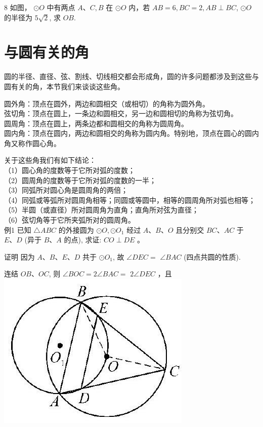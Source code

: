 \documentclass[10pt]{article}
\begin{document}
8 如图， $\odot O$ 中有两点 $A 、 C, B$ 在 $\odot O$ 内，若 $A B=6, B C=2, A B \perp B C$, $\odot O$ 的半径为 $5 \sqrt{2}$, 求 $O B$.

\section*{与圆有关的角}
圆的半径、直径、弦、割线、切线相交都会形成角，圆的许多问题都涉及到这些与圆有关的角，本节我们来谈谈这些角。

圆外角：顶点在圆外，两边和圆相交（或相切）的角称为圆外角。\\
弦切角：顶点在圆上，一条边和圆相交，另一边和圆相切的角称为弦切角。\\
圆周角：顶点在圆上，两条边都和圆相交的角称为圆周角。\\
圆内角：顶点在圆内，两边和圆相交的角称为圆内角。特别地，顶点在圆心的圆内角又称作圆心角。

关于这些角我们有如下结论：\\
（1）圆心角的度数等于它所对弧的度数；\\
（2）圆周角的度数等于它所对弧的度数的一半；\\
（3）同弧所对圆心角是圆周角的两倍；\\
（4）同弧或等弧所对圆周角相等；同圆或等圆中，相等的圆周角所对弧也相等；\\
（5）半圆（或直径）所对圆周角为直角；直角所对弦为直径；\\
（6）弦切角等于它所夹弧所对的圆周角。\\
例1 已知 $\triangle A B C$ 的外接圆为 $\odot O, \odot O_{1}$ 经过 $A 、 B 、 O$ 且分别交 $B C 、 A C$ 于 $E 、 D$ (异于 $B 、 A$ 的点), 求证: $C O \perp D E$ 。

证明 因为 $A 、 B 、 E 、 D$ 共于 $\odot O_{1}$, 故 $\angle D E C=$ $\angle B A C$ (四点共圆的性质).

连结 $O B 、 O C$, 则 $\angle B O C=2 \angle B A C=$ $2 \angle D E C$ ，且\\
\includegraphics[max width=\textwidth, center]{2024_10_30_66b8e5e701da2093c133g-022}
\end{document}
